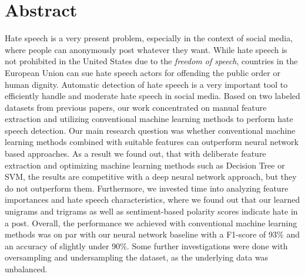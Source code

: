\section*{Abstract}

Hate speech is a very present problem, especially in the context of social media, where people can anonymously post whatever they want. While hate speech is not prohibited in the United States due to the \textit{freedom of speech}, countries in the European Union can sue hate speech actors for offending the public order or human dignity. Automatic detection of hate speech is a very important tool to efficiently handle and moderate hate speech in social media. 
Based on two labeled datasets from previous papers, our work concentrated on manual feature extraction and utilizing conventional machine learning methods to perform hate speech detection. Our main research question was whether conventional machine learning methods combined with suitable features can outperform neural network based approaches. As a result we found out, that with deliberate feature extraction and optimizing machine learning methods such as Decision Tree or SVM, the results are competitive with a deep neural network approach, but they do not outperform them. Furthermore, we invested time into analyzing feature importances and hate speech cha\-rac\-te\-ris\-tics, where we found out that our learned unigrams and trigrams as well as sentiment-based polarity scores indicate hate in a post.
Overall, the performance we achieved with conventional machine learning methods was on par with our neural network baseline with a F1-score of 93\% and an accuracy of slightly under 90\%.
Some further investigations were done with oversampling and undersampling the dataset, as the underlying data was unbalanced.
